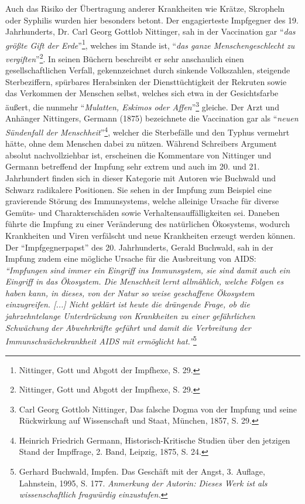 \documentclass[
    a4paper,
    12pt,
    hyphens,
    chapterprefix=true,
    headheight=33pt,
    footheight=29pt,
    headings=optiontohead,
]{scrartcl}
\begin{document}
{ Auch das Risiko der Übertragung anderer Krankheiten wie Krätze, Skropheln oder Syphilis wurden hier besonders betont. Der engagierteste Impfgegner des 19. Jahrhunderts, Dr. Carl Georg Gottlob Nittinger, sah in der Vaccination gar "`\textit{das größte Gift der Erde}"'\footnote{Nittinger, Gott und Abgott der Impfhexe, S. 29.}, welches im Stande ist, "`\textit{das ganze Menschengeschlecht zu vergiften}"'\footnote{Nittinger, Gott und Abgott der Impfhexe, S. 29.}. In seinen Büchern beschreibt er sehr anschaulich einen gesellschaftlichen Verfall, gekennzeichnet durch sinkende Volkszahlen, steigende Sterbeziffern, spürbares Herabsinken der Diensttüchtigkeit der Rekruten sowie das Verkommen der Menschen selbst, welches sich etwa in der Gesichtsfarbe äußert, die nunmehr "`\textit{Mulatten, Eskimos oder Affen}"'\footnote{Carl Georg Gottlob Nittinger, Das falsche Dogma von der Impfung und seine Rückwirkung auf Wissenschaft und Staat, München, 1857, S. 29.} gleiche. Der Arzt und Anhänger Nittingers, Germann (1875) bezeichnete die Vaccination gar als "`\textit{neuen Sündenfall der Menschheit}"'\footnote{Heinrich Friedrich Germann, Historisch-Kritische Studien über den jetzigen Stand der Impffrage, 2. Band, Leipzig, 1875, S. 24.}, welcher die Sterbefälle und den Typhus vermehrt hätte, ohne dem Menschen dabei zu nützen. Während Schreibers Argument absolut nachvollziehbar ist, erscheinen die Kommentare von Nittinger und Germann betreffend der Impfung sehr extrem und auch im 20. und 21. Jahrhundert finden sich in dieser Kategorie mit Autoren wie Buchwald und Schwarz radikalere Positionen. Sie sehen in der Impfung zum Beispiel eine gravierende Störung des Immunsystems, welche alleinige Ursache für diverse Gemüts- und Charakterschäden sowie Verhaltensauffälligkeiten sei. Daneben führte die Impfung zu einer Veränderung des natürlichen Ökosystems, wodurch Krankheiten und Viren verfälscht und neue Krankheiten erzeugt werden können. Der "`Impfgegnerpapst"' des 20. Jahrhunderts, Gerald Buchwald, sah in der Impfung zudem eine mögliche Ursache für die Ausbreitung von AIDS: \textit{"`Impfungen sind immer ein Eingriff ins Immunsystem, sie sind damit auch ein Eingriff in das Ökosystem. Die Menschheit lernt allmählich, welche Folgen es haben kann, in dieses, von der Natur so weise geschaffene Ökosystem einzugreifen. [...] Nicht geklärt ist heute die drängende Frage, ob die jahrzehntelange Unterdrückung von Krankheiten zu einer gefährlichen Schwächung der Abwehrkräfte geführt und damit die Verbreitung der Immunschwächekrankheit AIDS mit ermöglicht hat."'}\footnote{Gerhard Buchwald, Impfen. Das Geschäft mit der Angst, 3. Auflage, Lahnstein, 1995, S. 177. \textit{Anmerkung der Autorin: Dieses Werk ist als wissenschaftlich fragwürdig einzustufen.}} \\
}
\end{document}
